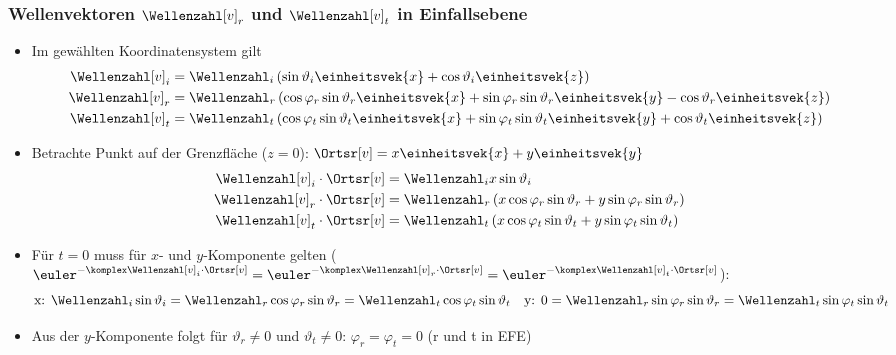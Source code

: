 \begin{frame}
  \frametitle{Wellenvektoren \(\Wellenzahl[v]_r\) und \(\Wellenzahl[v]_t\) in Einfallsebene}
  \begin{itemize}[<+->]
  \item Im gewählten Koordinatensystem gilt
    \begin{align*}
      \Wellenzahl[v]_i &= \Wellenzahl_i \left( \sin\vartheta_i\einheitsvek{x} + \cos\vartheta_i\einheitsvek{z} \right)\\
      \Wellenzahl[v]_r &= \Wellenzahl_r \left( \cos\varphi_r\sin\vartheta_r\einheitsvek{x} + \sin\varphi_r\sin\vartheta_r\einheitsvek{y}  - \cos\vartheta_r\einheitsvek{z}\right) \\
      \Wellenzahl[v]_t &= \Wellenzahl_t \left( \cos\varphi_t\sin\vartheta_t\einheitsvek{x} + \sin\varphi_t\sin\vartheta_t\einheitsvek{y}  + \cos\vartheta_t\einheitsvek{z}\right) 
    \end{align*}
    \item Betrachte Punkt auf der Grenzfläche (\(z=0\)): \(\Ortsr[v] = x\einheitsvek{x} + y\einheitsvek{y} \)
    \begin{align*}
      \Wellenzahl[v]_i\cdot\Ortsr[v] &= \Wellenzahl_i x\sin\vartheta_i \\
      \Wellenzahl[v]_r \cdot\Ortsr[v]&= \Wellenzahl_r \left( x\cos\varphi_r\sin\vartheta_r + y\sin\varphi_r\sin\vartheta_r \right) \\
      \Wellenzahl[v]_t \cdot\Ortsr[v]&= \Wellenzahl_t \left( x\cos\varphi_t\sin\vartheta_t + y\sin\varphi_t\sin\vartheta_t \right) 
    \end{align*}
  \item Für \(t=0\) muss für \(x\)- und \(y\)-Komponente gelten (\(\euler^{-\komplex\Wellenzahl[v]_i\cdot\Ortsr[v]} = \euler^{-\komplex\Wellenzahl[v]_r\cdot\Ortsr[v]} = \euler^{-\komplex\Wellenzahl[v]_t\cdot\Ortsr[v]}\)):
    \begin{equation*}
      \text{x: }\Wellenzahl_i\sin\vartheta_i = \Wellenzahl_r\cos\varphi_r\sin\vartheta_r =\Wellenzahl_t\cos\varphi_t\sin\vartheta_t \quad \text{y: }0=\Wellenzahl_r\sin\varphi_r\sin\vartheta_r = \Wellenzahl_t\sin\varphi_t\sin\vartheta_t
    \end{equation*}
  \item Aus der \(y\)-Komponente folgt für \(\vartheta_r\ne 0\) und \(\vartheta_t\ne 0\): \(\boxed{\varphi_r=\varphi_t=0}\) (\alert{r und t in EFE})
  \end{itemize}
\end{frame}

